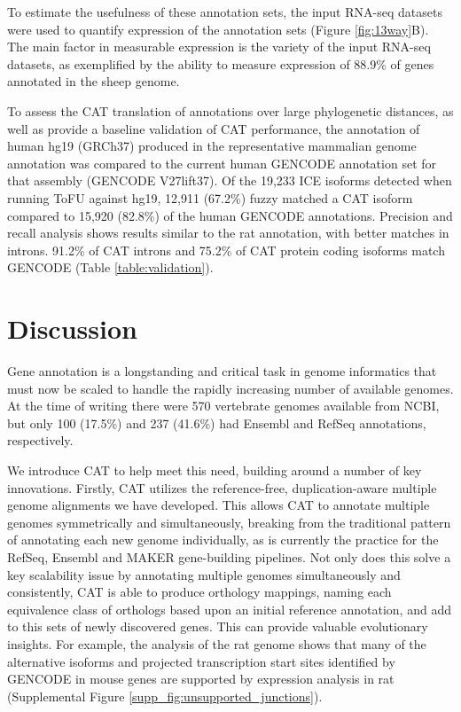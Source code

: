\documentclass[fleqn,10pt]{wlscirep}
\begin{document}
To estimate the usefulness of these annotation sets, the input RNA-seq datasets were used to quantify expression of the annotation sets (Figure \ref{fig:13way}B). The main factor in measurable expression is the variety of the input RNA-seq datasets, as exemplified by the ability to measure expression of 88.9\% of genes annotated in the sheep genome. 

To assess the CAT translation of annotations over large phylogenetic distances, as well as provide a baseline validation of CAT performance, the annotation of human hg19 (GRCh37) produced in the representative mammalian genome annotation was compared to the current human GENCODE annotation set for that assembly (GENCODE V27lift37). Of the 19,233 ICE isoforms detected when running ToFU \cite{gordon2015widespread} against hg19, 12,911 (67.2\%) fuzzy matched a CAT isoform compared to 15,920 (82.8\%) of the human GENCODE annotations. Precision and recall analysis shows results similar to the rat annotation, with better matches in introns. 91.2\% of CAT introns and 75.2\% of CAT protein coding isoforms match GENCODE (Table \ref{table:validation}).

\section*{Discussion}

Gene annotation is a longstanding and critical task in genome informatics that must now be scaled to handle the rapidly increasing number of available genomes. At the time of writing there were 570 vertebrate genomes available from NCBI, but only 100 (17.5\%) and 237 (41.6\%) had Ensembl and RefSeq annotations, respectively.

We introduce CAT to help meet this need, building around a number of key innovations. 
Firstly, CAT utilizes the reference-free, duplication-aware multiple genome alignments we have developed. This allows CAT to annotate multiple genomes symmetrically and simultaneously, breaking from the traditional pattern of annotating each new genome individually, as is currently the practice for the RefSeq, Ensembl and MAKER gene-building pipelines.
Not only does this solve a key scalability issue 
by annotating multiple genomes simultaneously and consistently, CAT is able to produce orthology mappings, naming each equivalence class of orthologs based upon an initial reference annotation, and add to this sets of newly discovered genes. This can provide valuable evolutionary insights. For example, the analysis of the rat genome shows that many of the alternative isoforms and projected transcription start sites identified by GENCODE in mouse genes are supported by expression analysis in rat (Supplemental Figure \ref{supp_fig:unsupported_junctions}).
\end{document}

